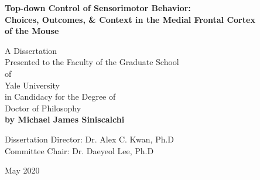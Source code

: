 
\begin{titlepage}
\centering
\singlespace

\vspace*{1in}
\textbf{
Top-down Control of Sensorimotor Behavior:\\
Choices, Outcomes, \& Context in the Medial Frontal Cortex\\
of the Mouse
}
 
\vfill
A Dissertation\\Presented to the Faculty of the Graduate School\\of\\Yale University\\
in Candidacy for the Degree of\\Doctor of Philosophy\\

\vfill
\textbf{by Michael James Siniscalchi}

\vspace{0.5in}
Dissertation Director: Dr. Alex C. Kwan, Ph.D\\
Committee Chair: Dr. Daeyeol Lee, Ph.D

\vspace{0.5in}
May 2020
 
\vspace{1in}
\end{titlepage}